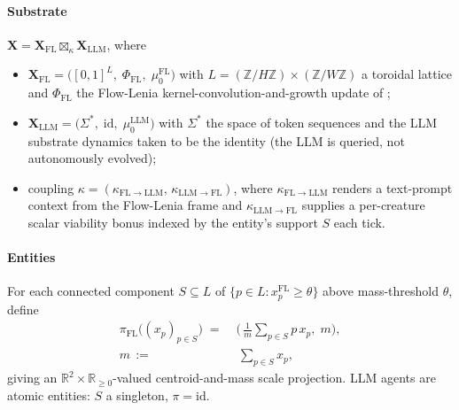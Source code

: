 \documentclass[journal]{IEEEtran}
\theoremstyle{plain}
\theoremstyle{definition}
\theoremstyle{plain}
\newcommand{\R}{\mathbb{R}}
\newcommand{\X}{\mathbf{X}}
\begin{document}
\paragraph{Substrate}
$\X = \X_{\mathrm{FL}} \boxtimes_{\kappa} \X_{\mathrm{LLM}}$, where
\begin{itemize}[leftmargin=1.5em,itemsep=2pt]
  \item $\X_{\mathrm{FL}} = \big([0,1]^{L},\; \Phi_{\mathrm{FL}},\;
        \mu_{0}^{\mathrm{FL}}\big)$ with $L = (\mathbb{Z}/H\mathbb{Z})\times(\mathbb{Z}/W\mathbb{Z})$ a
        toroidal lattice and $\Phi_{\mathrm{FL}}$ the Flow-Lenia
        kernel-convolution-and-growth update of
        \cite{plantec2023flowlenia};
  \item $\X_{\mathrm{LLM}} = \big(\Sigma^{*},\; \mathrm{id},\;
        \mu_{0}^{\mathrm{LLM}}\big)$ with $\Sigma^{*}$ the space of token
        sequences and the LLM substrate dynamics taken to be the identity
        (the LLM is queried, not autonomously evolved);
  \item coupling $\kappa = (\kappa_{\mathrm{FL}\to\mathrm{LLM}},\,
        \kappa_{\mathrm{LLM}\to\mathrm{FL}})$, where
        $\kappa_{\mathrm{FL}\to\mathrm{LLM}}$ renders a text-prompt
        context from the Flow-Lenia frame and
        $\kappa_{\mathrm{LLM}\to\mathrm{FL}}$ supplies a per-creature
        scalar viability bonus indexed by the entity's support $S$ each
        tick.
\end{itemize}

\paragraph{Entities}
For each connected component $S \subseteq L$ of
$\{p \in L : x^{\mathrm{FL}}_{p} \geq \theta\}$ above mass-threshold
$\theta$, define
\begin{align*}
  \pi_{\mathrm{FL}}\big((x_{p})_{p\in S}\big) \;=\;
  &\Big(\,\tfrac{1}{m}\textstyle\sum_{p\in S} p\, x_{p},\; m\Big),\\
  m \,:=&\, \textstyle\sum_{p\in S} x_{p},
\end{align*}
giving an $\R^{2}\!\times\!\R_{\geq 0}$-valued centroid-and-mass scale
projection. LLM agents are atomic entities: $S$ a singleton, $\pi=\mathrm{id}$.
\end{document}
